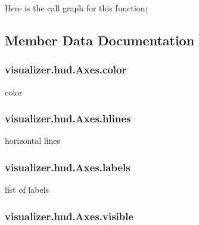 Here is the call graph for this function\+:




\subsection{Member Data Documentation}
\subsubsection[{\texorpdfstring{color}{color}}]{\setlength{\rightskip}{0pt plus 5cm}visualizer.\+hud.\+Axes.\+color}\hypertarget{classvisualizer_1_1hud_1_1Axes_ad728f986aa77a67a9ac95ee7ce7f56a9}{}\label{classvisualizer_1_1hud_1_1Axes_ad728f986aa77a67a9ac95ee7ce7f56a9}


color 

\subsubsection[{\texorpdfstring{hlines}{hlines}}]{\setlength{\rightskip}{0pt plus 5cm}visualizer.\+hud.\+Axes.\+hlines}\hypertarget{classvisualizer_1_1hud_1_1Axes_a0cf5bfdbee64daf149fd3fcb26c7f662}{}\label{classvisualizer_1_1hud_1_1Axes_a0cf5bfdbee64daf149fd3fcb26c7f662}


horizontal lines 

\subsubsection[{\texorpdfstring{labels}{labels}}]{\setlength{\rightskip}{0pt plus 5cm}visualizer.\+hud.\+Axes.\+labels}\hypertarget{classvisualizer_1_1hud_1_1Axes_a8f7a1ac8f65e14502dfb45b127b7b9df}{}\label{classvisualizer_1_1hud_1_1Axes_a8f7a1ac8f65e14502dfb45b127b7b9df}


list of labels 

\subsubsection[{\texorpdfstring{visible}{visible}}]{\setlength{\rightskip}{0pt plus 5cm}visualizer.\+hud.\+Axes.\+visible}\hypertarget{classvisualizer_1_1hud_1_1Axes_ae1618ac7b34eb439fb93ec44f6b55347}{}\label{classvisualizer_1_1hud_1_1Axes_ae1618ac7b34eb439fb93ec44f6b55347}


